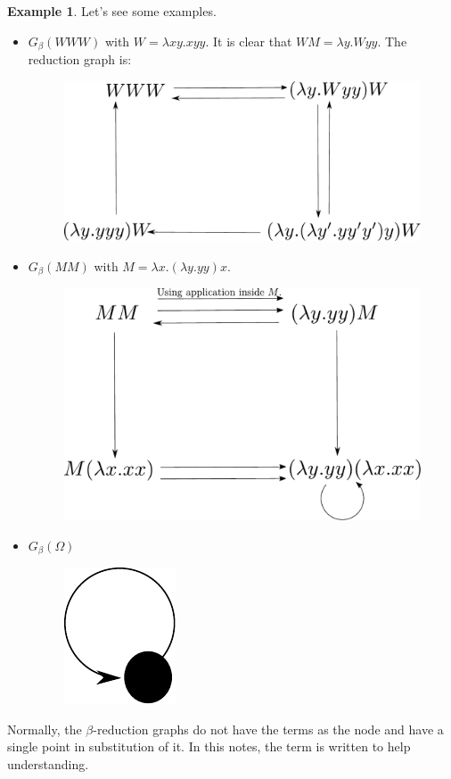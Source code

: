 \documentclass[11pt]{article}
\theoremstyle{definition}
\theoremstyle{remark}
\theoremstyle{remark}
\theoremstyle{definition}
\newtheorem{example}{Example}
\begin{document}
\begin{example}
  Let's see some examples.
  \begin{itemize}
    \item $G_\beta(WWW)$ with $W = \lambda xy. xyy$. It is clear that
          $WM = \lambda y. Wyy$. The reduction graph is:
          \begin{figure}[h]
            \centering
            \includegraphics[scale=0.4]{../graphs/example-graph-1.pdf}
          \end{figure}

    \item $G_\beta(MM)$ with $M = \lambda x. (\lambda y.yy)x$.
          \begin{figure}[h]
            \centering
            \includegraphics[scale=0.4]{../graphs/example-graph-2.pdf}
          \end{figure}

    \item $G_\beta(\Omega)$
          \begin{figure}[H]
            \centering \includegraphics[scale=0.4]{../graphs/example-omega.pdf}
          \end{figure}
  \end{itemize}
  Normally, the $\beta$-reduction graphs do not have the terms as the node and
  have a single point in substitution of it. In this notes, the term is written
  to help understanding.
\end{example}
\end{document}
